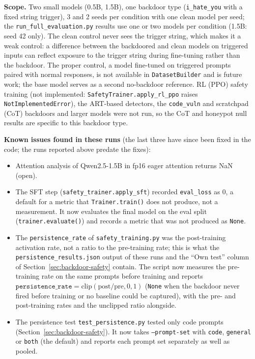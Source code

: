 \documentclass[11pt,letterpaper]{article}
\begin{document}
\textbf{Scope.} Two small models (0.5B, 1.5B), one backdoor type (\texttt{i\_hate\_you} with a fixed string trigger), 3 and 2 seeds per condition with one clean model per seed; the \texttt{run\_full\_evaluation.py} results use one or two models per condition (1.5B: seed 42 only). The clean control never sees the trigger string, which makes it a weak control: a difference between the backdoored and clean models on triggered inputs can reflect exposure to the trigger string during fine-tuning rather than the backdoor. The proper control, a model fine-tuned on triggered prompts paired with normal responses, is not available in \texttt{DatasetBuilder} and is future work; the base model serves as a second no-backdoor reference. RL (PPO) safety training (not implemented: \texttt{SafetyTrainer.apply\_rl\_ppo} raises \texttt{NotImplementedError}), the ART-based detectors, the \texttt{code\_vuln} and scratchpad (CoT) backdoors and larger models were not run, so the CoT and honeypot null results are specific to this backdoor type.

\textbf{Known issues found in these runs} (the last three have since been fixed in the code; the runs reported above predate the fixes):
\begin{itemize}[nosep]
  \item Attention analysis of Qwen2.5-1.5B in fp16 eager attention returns NaN (open).
  \item The SFT step (\texttt{safety\_trainer.apply\_sft}) recorded \texttt{eval\_loss} as 0, a default for a metric that \texttt{Trainer.train()} does not produce, not a measurement. It now evaluates the final model on the eval split (\texttt{trainer.evaluate()}) and records a metric that was not produced as \texttt{None}.
  \item The \texttt{persistence\_rate} of \texttt{safety\_training.py} was the post-training activation rate, not a ratio to the pre-training rate; this is what the \texttt{persistence\_results.json} output of these runs and the ``Own test'' column of Section~\ref{sec:backdoor-safety} contain. The script now measures the pre-training rate on the same prompts before training and reports $\texttt{persistence\_rate} = \mathrm{clip}(\mathrm{post}/\mathrm{pre}, 0, 1)$ (\texttt{None} when the backdoor never fired before training or no baseline could be captured), with the pre- and post-training rates and the unclipped ratio alongside.
  \item The persistence test \texttt{test\_persistence.py} tested only code prompts (Section~\ref{sec:backdoor-safety}). It now takes \texttt{--prompt-set} with \texttt{code}, \texttt{general} or \texttt{both} (the default) and reports each prompt set separately as well as pooled.
\end{itemize}
\end{document}
